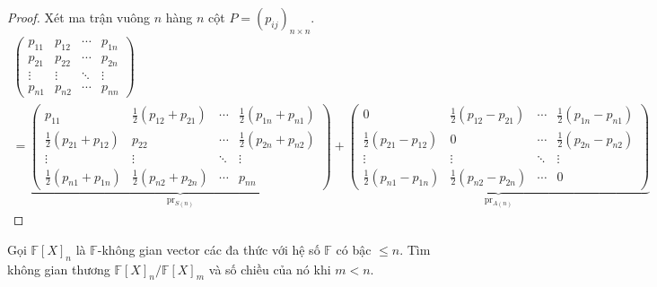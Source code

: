 \begin{proof}
    Xét ma trận vuông $n$ hàng $n$ cột $P = {(p_{ij})}_{n\times n}$.
    \begin{gather*}
        \begin{pmatrix}
            p_{11} & p_{12} & \cdots & p_{1n} \\
            p_{21} & p_{22} & \cdots & p_{2n} \\
            \vdots & \vdots & \ddots & \vdots \\
            p_{n1} & p_{n2} & \cdots & p_{nn}
        \end{pmatrix} \\
        =
        \underbrace{
            \begin{pmatrix}
                p_{11}                       & \frac{1}{2}(p_{12} + p_{21}) & \cdots & \frac{1}{2}(p_{1n} + p_{n1}) \\
                \frac{1}{2}(p_{21} + p_{12}) & p_{22}                       & \cdots & \frac{1}{2}(p_{2n} + p_{n2}) \\
                \vdots                       & \vdots                       & \ddots & \vdots                       \\
                \frac{1}{2}(p_{n1} + p_{1n}) & \frac{1}{2}(p_{n2} + p_{2n}) & \cdots & p_{nn}
            \end{pmatrix}
        }_{\operatorname{pr}_{S(n)}}+
        \underbrace{
            \begin{pmatrix}
                0                            & \frac{1}{2}(p_{12} - p_{21}) & \cdots & \frac{1}{2}(p_{1n} - p_{n1}) \\
                \frac{1}{2}(p_{21} - p_{12}) & 0                            & \cdots & \frac{1}{2}(p_{2n} - p_{n2}) \\
                \vdots                       & \vdots                       & \ddots & \vdots                       \\
                \frac{1}{2}(p_{n1} - p_{1n}) & \frac{1}{2}(p_{n2} - p_{2n}) & \cdots & 0
            \end{pmatrix}
        }_{\operatorname{pr}_{A(n)}}
    \end{gather*}
\end{proof}

\begin{exercise}
    Gọi ${\mathbb{F}[X]}_{n}$ là $\mathbb{F}$-không gian vector các đa thức với hệ số $\mathbb{F}$ có bậc $\le n$. Tìm không gian thương ${\mathbb{F}[X]}_{n}/{\mathbb{F}[X]}_{m}$ và số chiều của nó khi $m < n$.
\end{exercise}

